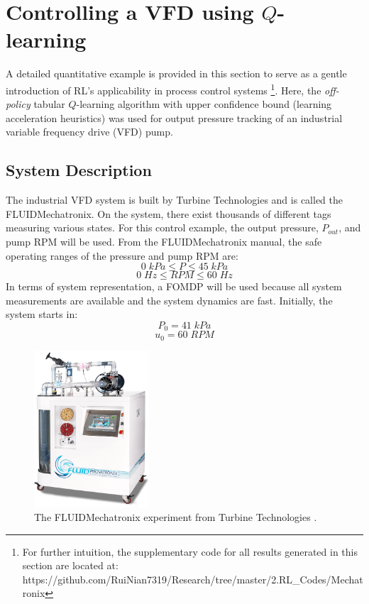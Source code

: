 \section{Controlling a VFD using $Q$-learning}
A detailed quantitative example is provided in this section to serve as a gentle introduction of RL's applicability in process control systems \footnote{For further intuition, the supplementary code for all results generated in this section are located at: https://github.com/RuiNian7319/Research/tree/master/2.RL\_Codes/Mechatronix}. Here, the \textit{off-policy} tabular $Q$-learning algorithm with upper confidence bound (learning acceleration heuristics) was used for output pressure tracking of an industrial variable frequency drive (VFD) pump. 

\subsection{System Description}
The industrial VFD system is built by Turbine Technologies and is called the FLUIDMechatronix.  On the system, there exist thousands of different tags measuring various states. For this control example, the output pressure, $P_{out}$, and pump RPM will be used. From the FLUIDMechatronix manual, the safe operating ranges of the pressure and pump RPM are:
$$0 \; kPa \leq P  \leq 45 \; kPa$$
$$0 \; Hz \leq RPM  \leq 60 \; Hz$$
In terms of system representation, a FOMDP will be used because all system measurements are available and the system dynamics are fast. Initially, the system starts in:
\begin{equation}
    P_0 = 41 \; kPa
    \label{eq:initial_p}
\end{equation}
\begin{equation}
    u_0 = 60 \; RPM
    \label{eq:initial_u}
\end{equation}

\begin{figure}[H]
    \centering
    \includegraphics[width=0.38\textwidth]{images/ch4/Mechatronix.jpeg}
    \caption{The FLUIDMechatronix experiment from Turbine Technologies \cite{turbine}.}
    \label{fig:mechatronix}
\end{figure}

